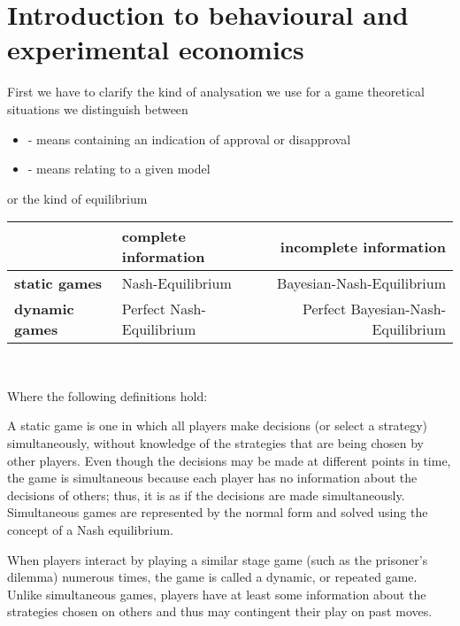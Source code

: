 

\chapter{Introduction to behavioural and experimental economics}

First we have to clarify the kind of analysation we use for a game theoretical situations we distinguish between
\begin{itemize}
	\item {} - means containing an indication of approval or disapproval
	\item {} - means relating to a given model
\end{itemize}

or the kind of equilibrium

\begin{tabular}{|l|l|r|}
	\hline\hline
  			& {\textbf{complete information}} & {\textbf{incomplete information}} \\
                                                    \hline
   \textbf{static games} & Nash-Equilibrium & Bayesian-Nash-Equilibrium\arrayrulewidth2pt \\
                                               \cline{1-3}
   \textbf{dynamic games} & Perfect Nash-Equilibrium & Perfect Bayesian-Nash-Equilibrium \\ \hline\hline
\end{tabular}
	
~\newline	
	
Where the following definitions hold:

\begin{definition} 
	A static game is one in which all players make decisions (or select a strategy) simultaneously, without knowledge of the strategies that are being chosen by other players. Even though the decisions may be made at different points in time, the game is simultaneous because each player has no information about the decisions of others; thus, it is as if the decisions are made simultaneously. Simultaneous games are represented by the normal form and solved using the concept of a Nash equilibrium.
\end{definition}

\begin{definition} 
When players interact by playing a similar stage game (such as the prisoner's dilemma) numerous times, the game is called a dynamic, or repeated game. Unlike simultaneous games, players have at least some information about the strategies chosen on others and thus may contingent their play on past moves.
\end{definition}


